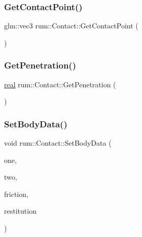 \mbox{\label{classrum_1_1_contact_a1a21b5351b7b4a84e05557232cc8b838}} 
\subsubsection{\texorpdfstring{Get\+Contact\+Point()}{GetContactPoint()}}
{\footnotesize\ttfamily glm\+::vec3 rum\+::\+Contact\+::\+Get\+Contact\+Point (\begin{DoxyParamCaption}{ }\end{DoxyParamCaption})}

\mbox{\label{classrum_1_1_contact_a337aa264d344357959c3f31494610292}} 
\subsubsection{\texorpdfstring{Get\+Penetration()}{GetPenetration()}}
{\footnotesize\ttfamily \hyperlink{namespacerum_a7e8cca23573d5eaead0f138cbaa4862c}{real} rum\+::\+Contact\+::\+Get\+Penetration (\begin{DoxyParamCaption}{ }\end{DoxyParamCaption})}

\mbox{\label{classrum_1_1_contact_ada3b091bf846f790e889c9cc526f47df}} 
\subsubsection{\texorpdfstring{Set\+Body\+Data()}{SetBodyData()}}
{\footnotesize\ttfamily void rum\+::\+Contact\+::\+Set\+Body\+Data (\begin{DoxyParamCaption}\item[{\hyperlink{classrum_1_1_rigid_body}{Rigid\+Body} $\ast$}]{one,  }\item[{\hyperlink{classrum_1_1_rigid_body}{Rigid\+Body} $\ast$}]{two,  }\item[{\hyperlink{namespacerum_a7e8cca23573d5eaead0f138cbaa4862c}{real}}]{friction,  }\item[{\hyperlink{namespacerum_a7e8cca23573d5eaead0f138cbaa4862c}{real}}]{restitution }\end{DoxyParamCaption})}


